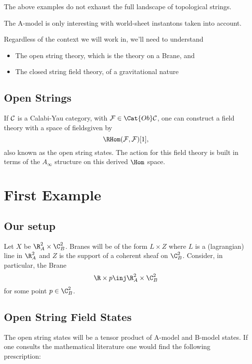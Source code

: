 \documentclass[12pt]{amsart}
\begin{document}
\begin{rmk}
  The above examples do not exhaust the full landscape of topological
  strings. %
\end{rmk}

\begin{rmk}
  The A-model is only interesting with world-sheet instantons taken into
  account.
\end{rmk}

Regardless of the context we will work in, we'll need to understand

\begin{itemize}
  \item The open string theory, which is the theory on a Brane, and
  \item The closed string field theory, of a gravitational nature
\end{itemize}

\subsection{Open Strings}
If $\mathcal{C}$ is a Calabi-Yau category, with $\mc{F} \in \Cat{Ob}\mc{C}$, one
can construct a field theory with a space of
fields\footnotemark{}given by
$$\RHom(\mc{F},\mc{F})[1],$$
also known as the open string states. The action for this field theory is
built in terms of the $A_{\infty}$ structure\footnotemark{} on this derived $\Hom$ space.

  \section{First Example}

\subsection{Our setup}
  Let $X$ be $\R^2_A \times \C^2_B$. Branes will be of the form $L \times Z$
  where $L$ is a (lagrangian) line in $\R^2_A$ and $Z$ is the support of a
  coherent sheaf on $\C^2_B$. Consider, in particular, the Brane $$\R \times p
  \inj \R^2_A \times \C^2_B$$ for some point $p \in \C^2_B$.

\subsection{Open String Field States}
  The open string states will be a tensor product of A-model and B-model
  states. If one consults the mathematical literature one would find the
  following prescription:
\end{document}
